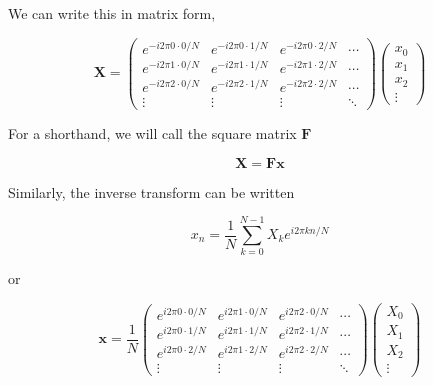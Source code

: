 \documentclass[12pt]{article}
\begin{document}
We can write this in matrix form,

\begin{equation}
\mathbf{X} = \left( \begin{array}{cccc}
   e^{-i 2\pi 0 \cdot 0 / N} & e^{-i 2\pi 0\cdot 1 / N} & e^{-i 2\pi 0 \cdot 2 / N} & \cdots \\
   e^{-i 2\pi 1 \cdot 0 / N} & e^{-i 2\pi 1 \cdot1 / N} & e^{-i 2\pi 1 \cdot 2 / N} & \cdots \\
   e^{-i 2\pi 2 \cdot 0 / N} & e^{-i 2\pi 2 \cdot 1 / N} & e^{-i 2\pi 2 \cdot 2 / N} & \cdots \\
   \vdots & \vdots & \vdots & \ddots
   \end{array} \right)
   \left( \begin{array}{c} x_0 \\ x_1 \\ x_2 \\ \vdots \end{array} \right)
\end{equation}

For a shorthand, we will call the square matrix $\mathbf{F}$

\begin{equation}
\mathbf{X} = \mathbf{F} \mathbf{x}
\end{equation}

Similarly, the inverse transform can be written

\begin{equation}
x_n = \frac{1}{N} \sum_{k=0}^{N-1} X_k e^{i 2 \pi k n / N}
\end{equation}

or

\begin{equation}
   \mathbf{x} = \frac{1}{N} \left( \begin{array}{cccc}
   e^{i 2\pi 0 \cdot 0 / N} & e^{i 2\pi 1 \cdot 0 / N} & e^{i 2\pi 2 \cdot 0 / N} & \cdots \\
   e^{i 2\pi 0 \cdot 1 / N} & e^{i 2\pi 1 \cdot 1 / N} & e^{i 2\pi 2 \cdot 1 / N} & \cdots \\
   e^{i 2\pi 0 \cdot 2 / N} & e^{i 2\pi 1 \cdot 2 / N} & e^{i 2\pi 2 \cdot 2 / N} & \cdots \\
   \vdots & \vdots & \vdots & \ddots
   \end{array} \right)
   \left( \begin{array}{c} X_0 \\ X_1 \\ X_2 \\ \vdots \end{array} \right)
\end{equation}
\end{document}
